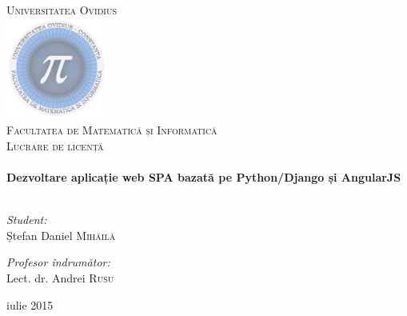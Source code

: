 \begin{titlepage}
\begin{center}

\textsc{\LARGE Universitatea Ovidius}\\[1.5cm]

\includegraphics[width=0.25\textwidth]{./logo}~\\[1cm]
\textsc{\LARGE Facultatea de Matematică și Informatică}\\[1.5cm]

\textsc{\Large Lucrare de licență}\\[0.5cm]

\HRule \\[0.4cm]
{ \huge \bfseries Dezvoltare aplicație web SPA bazată pe Python/Django și AngularJS \\[0.4cm] }
\HRule \\[1.5cm]

\noindent
\begin{minipage}[t]{0.4\textwidth}
\begin{flushleft} \large
\emph{Student:}\\
Ștefan Daniel \textsc{Mihăilă}
\end{flushleft}
\end{minipage}%
\begin{minipage}[t]{0.4\textwidth}
\begin{flushright} \large
\emph{Profesor îndrumător:} \\
Lect. dr. Andrei \textsc{Rusu}
\end{flushright}
\end{minipage}

\vfill

{\large iulie 2015}

\end{center}
\end{titlepage}